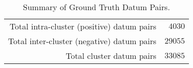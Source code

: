 \begin{table}[htp]
	\begin{center}
	\caption{Summary of Ground Truth Datum Pairs.}
	\label{tab:table_pair_summary}
		\begin{tabular}{r r}
		\toprule
			Total intra-cluster (positive) datum pairs & $4030$\\
			Total inter-cluster (negative) datum pairs & $29055$\\
			\midrule Total cluster datum pairs & $33085$\\
		\bottomrule
		\end{tabular}
	\end{center}
\end{table}